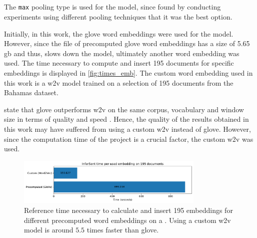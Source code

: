 \subsection*{\infersent{}}\label{subsec:evaluation-inferSent}

The \texttt{max} pooling type is used for the \infersent{} model, since \citeauthor{inferSent2018} 
found by conducting experiments using different pooling techniques that it was the best option.

Initially, in this work, the \ac{glove} word embeddings were used for the \infersent{} model.
However, since the file of precomputed \acs{glove} word embeddings has a size of 5.65 \ac{gb} and thus,
slows down the model, ultimately another word embedding was used.
The time necessary to compute and insert 195 documents for specific embeddings is displayed in \autoref{fig:times_emb}.
The custom word embedding used in this work is a \ac{w2v} model trained on a selection of 195 documents from the Bahamas dataset.

\citeauthor{glove2014} state that \acs{glove} outperforms \ac{w2v} on the same corpus, 
vocabulary and window size in terms of quality and speed \cite{glove2014}.
Hence, the quality of the results obtained in this work may have suffered from using a custom \ac{w2v} instead of \acs{glove}.
However, since the computation time of the project is a crucial factor, the custom \ac{w2v} was used.

\begin{figure}%
    \centering
    \includegraphics[width=0.8\textwidth]{images/embeddings/infersent/InferSent_time_per_used_embedding_on_195_documents.pdf}
    \caption[Times for \infersent{} embeddings per precomputed word embedding]
    {Reference time necessary to calculate and insert 195 \infersent{} embeddings for different precomputed word embeddings on a \localMaschineStats{}.
    Using a custom \ac{w2v} model is around $5.5$ times faster than \ac{glove}.
    }
    \label{fig:times_emb}%
\end{figure}
